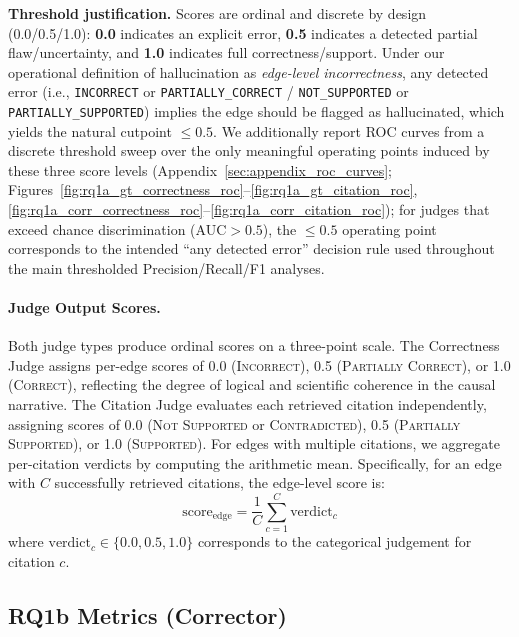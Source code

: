 \noindent\textbf{Threshold justification.} Scores are ordinal and discrete by design (0.0/0.5/1.0): \textbf{0.0} indicates an explicit error, \textbf{0.5} indicates a detected partial flaw/uncertainty, and \textbf{1.0} indicates full correctness/support. Under our operational definition of hallucination as \emph{edge-level incorrectness}, any detected error (i.e., \texttt{INCORRECT} or \texttt{PARTIALLY\_CORRECT} / \texttt{NOT\_SUPPORTED} or \texttt{PARTIALLY\_SUPPORTED}) implies the edge should be flagged as hallucinated, which yields the natural cutpoint \(\le 0.5\). We additionally report ROC curves from a discrete threshold sweep over the only meaningful operating points induced by these three score levels (Appendix~\ref{sec:appendix_roc_curves}; Figures~\ref{fig:rq1a_gt_correctness_roc}--\ref{fig:rq1a_gt_citation_roc}, \ref{fig:rq1a_corr_correctness_roc}--\ref{fig:rq1a_corr_citation_roc}); for judges that exceed chance discrimination (AUC$>0.5$), the \(\le 0.5\) operating point corresponds to the intended ``any detected error'' decision rule used throughout the main thresholded Precision/Recall/F1 analyses.

\paragraph{Judge Output Scores.}
Both judge types produce ordinal scores on a three-point scale. The Correctness Judge assigns per-edge scores of 0.0 (\textsc{Incorrect}), 0.5 (\textsc{Partially Correct}), or 1.0 (\textsc{Correct}), reflecting the degree of logical and scientific coherence in the causal narrative. The Citation Judge evaluates each retrieved citation independently, assigning scores of 0.0 (\textsc{Not Supported} or \textsc{Contradicted}), 0.5 (\textsc{Partially Supported}), or 1.0 (\textsc{Supported}). For edges with multiple citations, we aggregate per-citation verdicts by computing the arithmetic mean. Specifically, for an edge with $C$ successfully retrieved citations, the edge-level score is:
\begin{equation}
    \text{score}_{\text{edge}} = \frac{1}{C}\sum_{c=1}^{C} \text{verdict}_c
\end{equation}
where $\text{verdict}_c \in \{0.0, 0.5, 1.0\}$ corresponds to the categorical judgement for citation $c$.

\subsection{RQ1b Metrics (Corrector)}
\label{sec:metrics_rq1b}

